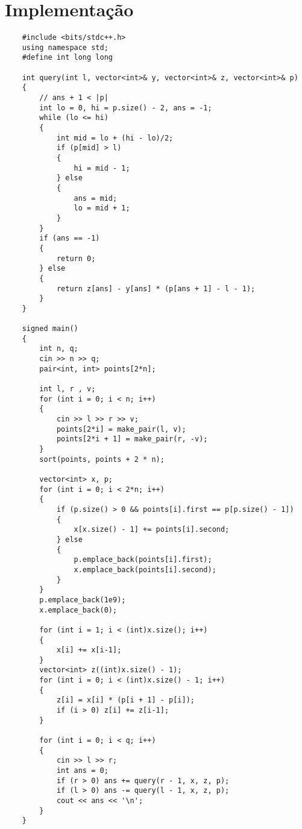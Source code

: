 \documentclass{article}
\begin{document}
\section{Implementação}
\begin{verbatim}
    #include <bits/stdc++.h>
    using namespace std;
    #define int long long
     
    int query(int l, vector<int>& y, vector<int>& z, vector<int>& p)
    {
        // ans + 1 < |p|
        int lo = 0, hi = p.size() - 2, ans = -1;
        while (lo <= hi)
        {
            int mid = lo + (hi - lo)/2;
            if (p[mid] > l)
            {
                hi = mid - 1;
            } else 
            {
                ans = mid;
                lo = mid + 1;
            }
        }
        if (ans == -1)
        {
            return 0;
        } else 
        {
            return z[ans] - y[ans] * (p[ans + 1] - l - 1); 
        }
    }
     
    signed main()
    {
        int n, q;
        cin >> n >> q;
        pair<int, int> points[2*n];
        
        int l, r , v;
        for (int i = 0; i < n; i++)
        {
            cin >> l >> r >> v;
            points[2*i] = make_pair(l, v);
            points[2*i + 1] = make_pair(r, -v);
        }
        sort(points, points + 2 * n);
        
        vector<int> x, p;
        for (int i = 0; i < 2*n; i++)
        {
            if (p.size() > 0 && points[i].first == p[p.size() - 1])
            {
                x[x.size() - 1] += points[i].second;
            } else 
            {
                p.emplace_back(points[i].first);
                x.emplace_back(points[i].second);
            }
        }
        p.emplace_back(1e9);
        x.emplace_back(0);
        
        for (int i = 1; i < (int)x.size(); i++)
        {
            x[i] += x[i-1];
        }
        vector<int> z((int)x.size() - 1);
        for (int i = 0; i < (int)x.size() - 1; i++)
        {
            z[i] = x[i] * (p[i + 1] - p[i]);
            if (i > 0) z[i] += z[i-1];
        }
        
        for (int i = 0; i < q; i++)
        {
            cin >> l >> r;
            int ans = 0;
            if (r > 0) ans += query(r - 1, x, z, p);
            if (l > 0) ans -= query(l - 1, x, z, p);
            cout << ans << '\n';
        }
    }
\end{verbatim}
\end{document}
